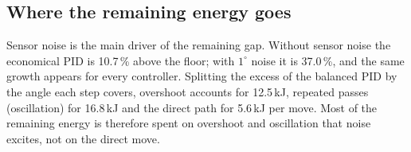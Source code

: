 \subsection{Where the remaining energy goes}
Sensor noise is the main driver of the remaining gap. Without sensor noise the economical PID is
10.7\,\% above the floor; with $1^\circ$ noise it is 37.0\,\%, and the same growth appears for every
controller. Splitting the excess of the balanced PID by the angle each step covers, overshoot
accounts for 12.5\,kJ, repeated passes (oscillation) for 16.8\,kJ and the direct path for
5.6\,kJ per move. Most of the remaining energy is therefore spent on overshoot and oscillation
that noise excites, not on the direct move.
